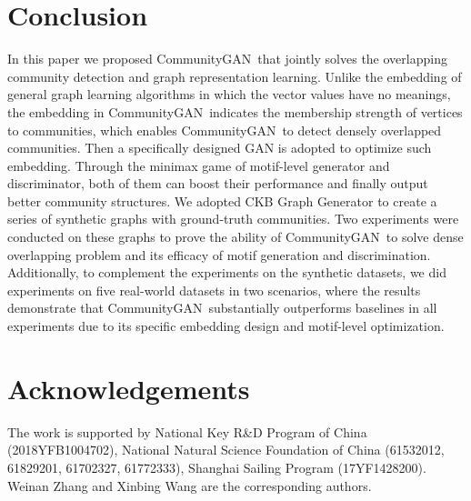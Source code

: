 \documentclass[sigconf]{acmart}
\newcommand{\ComGAN}{CommunityGAN}
\begin{document}
\section{Conclusion}
In this paper we proposed \ComGAN~that jointly solves the overlapping community detection and graph representation learning.
Unlike the embedding of general graph learning algorithms in which the vector values have no meanings, the embedding in \ComGAN~indicates the membership strength of vertices to communities, which enables \ComGAN~to detect densely overlapped communities.
Then a specifically designed GAN is adopted to optimize such embedding.
Through the minimax game of motif-level generator and discriminator, both of them can boost their performance and finally output better community structures.
We adopted CKB Graph Generator to create a series of synthetic graphs with ground-truth communities.
Two experiments were conducted on these graphs to prove the ability of \ComGAN~to solve dense overlapping problem and its efficacy of motif generation and discrimination.
Additionally, to complement the experiments on the synthetic datasets, we did experiments on five real-world datasets in two scenarios, where the results demonstrate that \ComGAN~substantially outperforms baselines in all experiments due to its specific embedding design and motif-level optimization.

\section{Acknowledgements}
The work is supported by National Key R\&D Program of China (2018YFB1004702), National Natural Science Foundation of China (61532012, 61829201, 61702327, 61772333), Shanghai Sailing Program (17YF1428200).
Weinan Zhang and Xinbing Wang are the corresponding authors.

\balance 

\end{document}
